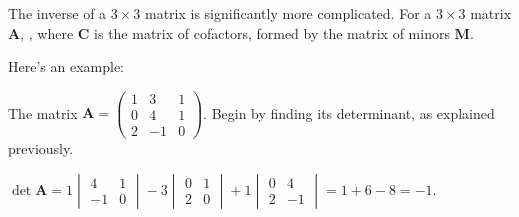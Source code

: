 \documentclass[../main.tex]{subfile}
\begin{document}
The inverse of a $3 \times 3$ matrix is significantly more complicated. For a $3 \times 3$ matrix $\mathbf{A}$, , where $\mathbf{C}$ is the matrix of cofactors, formed by the matrix of minors $\mathbf{M}$.

Here's an example:


The matrix $\displaystyle \mathbf{A} = \begin{pmatrix}1 & 3 & 1\\ 0 & 4 & 1\\ 2 & -1 & 0\end{pmatrix}$. Begin by finding its determinant, as explained previously.

$\det\mathbf{A} = 1 \begin{vmatrix}4 & 1\\ -1 & 0\end{vmatrix} - 3 \begin{vmatrix}0 & 1\\ 2 & 0\end{vmatrix} + 1 \begin{vmatrix}0 & 4\\ 2 & -1\end{vmatrix} = 1 + 6 - 8 = -1$.

\end{document}
